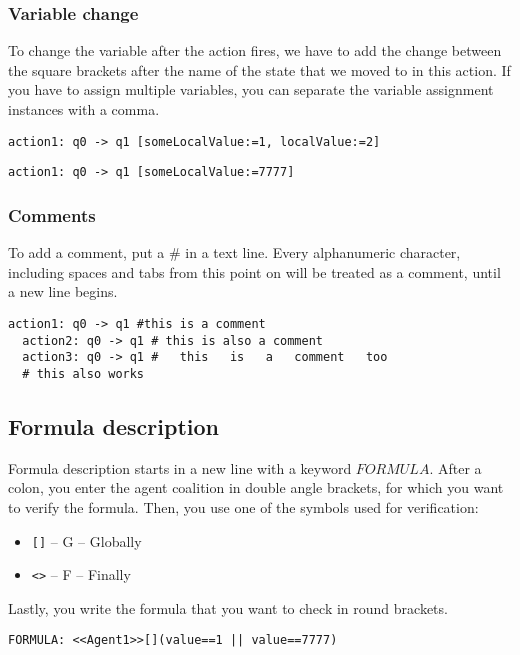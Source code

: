 \documentclass[12pt]{article}
\begin{document}
\subsubsection{Variable change}
To change the variable after the action fires, we have to add the change between the square brackets after the name of the state that we moved to in this action. If you have to assign multiple variables, you can separate the variable assignment instances with a comma.
\begin{lstlisting}[title={Action that sets the value of someLocalValue to 1 and localValue to 2.}]
  action1: q0 -> q1 [someLocalValue:=1, localValue:=2]
\end{lstlisting}
\begin{lstlisting}[title={Action that sets the value of someLocalValue to 7777.}]
  action1: q0 -> q1 [someLocalValue:=7777]
\end{lstlisting}

\subsubsection{Comments}
To add a comment, put a $\#$ in a text line. Every alphanumeric character, including spaces and tabs from this point on will be treated as a comment, until a new line begins.
\begin{lstlisting}[title={Example comments in a file.}]
  action1: q0 -> q1 #this is a comment
  action2: q0 -> q1 # this is also a comment
  action3: q0 -> q1 #   this   is   a   comment   too
  # this also works
\end{lstlisting}

\subsection{Formula description}
Formula description starts in a new line with a keyword $FORMULA$. After a colon, you enter the agent coalition in double angle brackets, for which you want to verify the formula. Then, you use one of the symbols used for verification:
\begin{itemize}
  \item \verb+[]+ -- G -- Globally
  \item \verb+<>+ -- F -- Finally
\end{itemize}
Lastly, you write the formula that you want to check in round brackets.
\begin{lstlisting}[title={A formula that checks if there is a strategy that globally Agent1 could take such actions that the value will be always equal to 1 or 7777.}]
  FORMULA: <<Agent1>>[](value==1 || value==7777)
\end{lstlisting}
\end{document}
